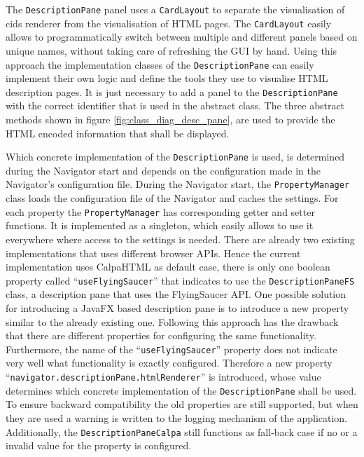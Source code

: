 The \texttt{DescriptionPane} panel uses a \texttt{CardLayout} to separate the visualisation of cids renderer from the visualisation of HTML pages.
The \texttt{CardLayout} easily allows to programmatically switch between multiple and different panels based on unique names, without taking care of refreshing the GUI by hand.
Using this approach the implementation classes of the \texttt{DescriptionPane} can easily implement their own logic and define the tools they use to visualise HTML description pages.
It is just necessary to add a panel to the \texttt{DescriptionPane} with the correct identifier that is used in the abstract class.
The three abstract methods shown in figure \ref{fig:class_diag_desc_pane}, are used to provide the HTML encoded information that shall be displayed.

Which concrete implementation of the \texttt{DescriptionPane} is used, is determined during the Navigator start and depends on the configuration made in the Navigator's configuration file.
During the Navigator start, the \texttt{PropertyManager} class loads the configuration file of the Navigator and caches the settings.
For each property the \texttt{PropertyManager} has corresponding getter and setter functions.
It is implemented as a singleton, which easily allows to use it everywhere where access to the settings is needed.
There are already two existing implementations that uses different browser APIs.
Hence the current implementation uses CalpaHTML as default case, there is only one boolean property called \enquote{\texttt{useFlyingSaucer}} that indicates to use the \texttt{DescriptionPaneFS} class, a description pane that uses the FlyingSaucer API.
One possible solution for introducing a JavaFX based description pane is to introduce a new property similar to the already existing one.
Following this approach has the drawback that there are different properties for configuring the same functionality.
Furthermore, the name of the \enquote{\texttt{useFlyingSaucer}} property does not indicate very well what functionality is exactly configured.
Therefore a new property \enquote{\texttt{navigator.descriptionPane.htmlRenderer}} is introduced, whose value determines which concrete implementation of the \texttt{DescriptionPane} shall be used.
To ensure backward compatibility the old properties are still supported, but when they are used a warning is written to the logging mechanism of the application.
Additionally, the \texttt{DescriptionPaneCalpa} still functions as fall-back case if no or a invalid value for the property is configured.

